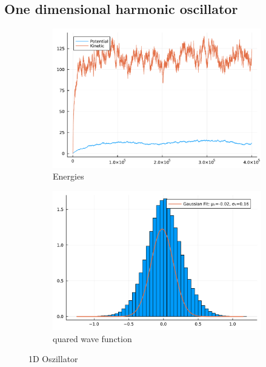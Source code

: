 \documentclass[
	a4paper, %
	10pt, %
]{CSUniSchoolLabReport}
\begin{document}
\subsection{One dimensional harmonic oscillator}


\begin{figure}[H]
	\begin{subfigure}[b]{0.49\textwidth}
		\centering
		\includegraphics[width=\textwidth]{../saves/task3a.energies.pdf}
		\caption{Energies}
	\end{subfigure}
	\hfill
	\begin{subfigure}[b]{0.49\textwidth}
		\centering
		\includegraphics[width=\textwidth]{../saves/task3b.hist.pdf}
		\caption{quared wave function}
	\end{subfigure}
	\caption{1D Oszillator}
	\label{fig:harmon1d}
\end{figure}
\end{document}

